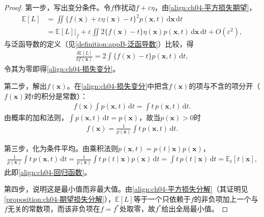 \documentclass[../../main.tex]{subfiles}
\begin{document}
\begin{proof}
第一步，写出变分条件。令$f$作扰动$f+\varepsilon\eta$，由\eqref{align:ch04-平方损失期望}，
\begin{align*}
  \mathbb{E}[L]&=\iint\bigl\{f(\boldsymbol{x})+\varepsilon\eta(\boldsymbol{x})-t\bigr\}^2p(\boldsymbol{x},t)\,\mathrm{d}\boldsymbol{x}\,\mathrm{d}t\\
  &=\mathbb{E}[L]\big|_{f}+\varepsilon\iint2\{f(\boldsymbol{x})-t\}\eta(\boldsymbol{x})p(\boldsymbol{x},t)\,\mathrm{d}\boldsymbol{x}\,\mathrm{d}t+O(\varepsilon^2),
\end{align*}
与泛函导数的定义（见\cref{definition:appB-泛函导数}）比较，得
\begin{align*}
  \frac{\delta\mathbb{E}[L]}{\delta f(\boldsymbol{x})}=2\int\{f(\boldsymbol{x})-t\}p(\boldsymbol{x},t)\,\mathrm{d}t,
\end{align*}
令其为零即得\eqref{align:ch04-损失变分}。

第二步，解出$f(\boldsymbol{x})$。在\eqref{align:ch04-损失变分}中把含$f(\boldsymbol{x})$的项与不含的项分开（$f(\boldsymbol{x})$对$t$的积分是常数）：
\begin{align*}
  f(\boldsymbol{x})\int p(\boldsymbol{x},t)\,\mathrm{d}t=\int t\,p(\boldsymbol{x},t)\,\mathrm{d}t.
\end{align*}
由概率的加和法则，$\int p(\boldsymbol{x},t)\,\mathrm{d}t=p(\boldsymbol{x})$，故当$p(\boldsymbol{x})>0$时
\begin{align*}
  f(\boldsymbol{x})=\frac{1}{p(\boldsymbol{x})}\int t\,p(\boldsymbol{x},t)\,\mathrm{d}t.
\end{align*}

第三步，化为条件平均。由乘积法则$p(\boldsymbol{x},t)=p(t\mid\boldsymbol{x})p(\boldsymbol{x})$，
\begin{align*}
  \frac{1}{p(\boldsymbol{x})}\int t\,p(\boldsymbol{x},t)\,\mathrm{d}t
  =\frac{1}{p(\boldsymbol{x})}\int t\,p(t\mid\boldsymbol{x})p(\boldsymbol{x})\,\mathrm{d}t
  =\int t\,p(t\mid\boldsymbol{x})\,\mathrm{d}t=\mathbb{E}_t[t\mid\boldsymbol{x}],
\end{align*}
此即\eqref{align:ch04-回归函数}。

第四步，说明这是最小值而非最大值。由\eqref{align:ch04-平方损失分解}（其证明见\cref{proposition:ch04-期望损失分解}），$\mathbb{E}[L]$等于一个只依赖于$f$的非负项加上一个与$f$无关的常数项，而该非负项在$f=f^*$处取零，故$f^*$给出全局最小值。
\end{proof}
\end{document}
